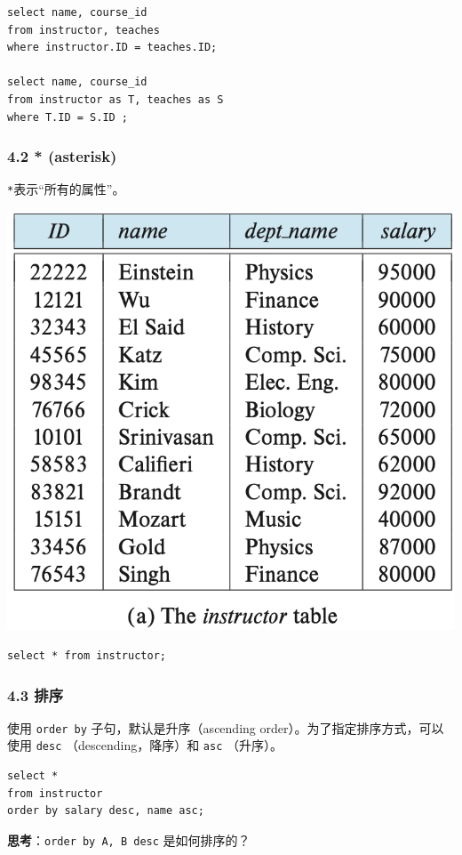 \documentclass[aspectratio=169, 14pt]{beamer}
\begin{document}
\begin{frame}[fragile]

	\begin{verbatim} 
select name, course_id
from instructor, teaches
where instructor.ID = teaches.ID;   

select name, course_id
from instructor as T, teaches as S
where T.ID = S.ID ;
    \end{verbatim}

\end{frame}

\begin{frame}[fragile]
	\frametitle{4.2 * (asterisk)}
	\texttt{*}表示“所有的属性”。

	\includegraphics[width=.6\textwidth,trim={0cm 8.5cm 0cm 0cm},clip]{table/instructor}

	\begin{verbatim} 
select * from instructor;
\end{verbatim}


\end{frame}

\begin{frame}[fragile]
	\frametitle{4.3 排序}
	使用 \texttt{order by} 子句，默认是升序（ascending order）。为了指定排序方式，可以使用 \texttt{desc} （descending，降序）和 \texttt{asc} （升序）。

	\begin{verbatim} 
select *
from instructor
order by salary desc, name asc;        
    \end{verbatim}

	 \textbf{思考}：\alert{\texttt{order by A, B desc}} 是如何排序的？
\end{frame}
\end{document}
